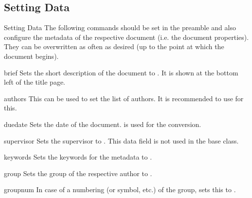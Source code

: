 \documentclass{sopra-seraphim}
\begin{document}
    \subsection{Setting Data}
    \label{sec:DatenSetzen}
    \begin{frame}{Setting Data}
        The following commands should be set in the preamble and also configure
        the metadata of the respective document (i.e. the document properties).
        They can be overwritten as often as desired (up to the point at which
        the document begins). 

        \begin{command}{brief}{}
            Sets the short description of the document to . It is shown at the bottom left of the title page. 
        \end{command}

        \begin{command}{authors}{}
            This can be used to set the list of authors. It is recommended
            to use  for this.
        \end{command}

        \begin{command}{duedate}{}
           Sets the date of the document.  is used
           for the conversion.
        \end{command}

        \begin{command}{supervisor}{}
            Sets the supervisor to . This data field is not used in the base class. 
        \end{command}

        \begin{command}{keywords}{}
            Sets the keywords for the metadata to .
        \end{command}

        \begin{command}{group}{}
            Sets the group of the respective author to .%
        \end{command}

        \begin{command}{groupnum}{}
            In case of a numbering (or symbol, etc.) of the group, sets this
            to .
        \end{command}
    \end{frame}
\end{document}
